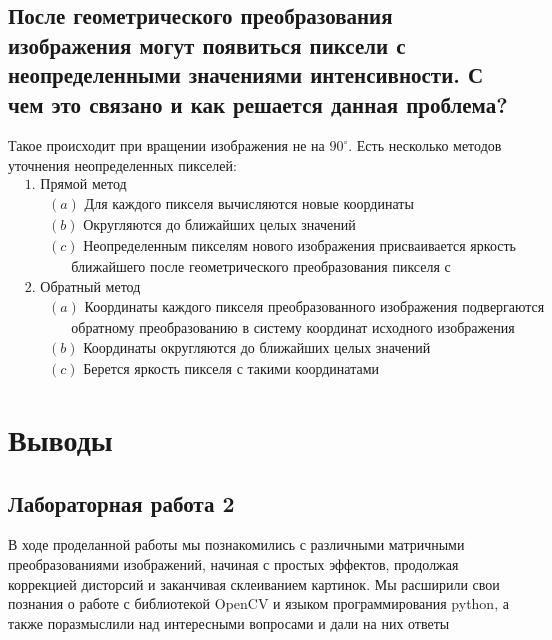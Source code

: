 \documentclass[a4paper, 16pt]{article}
\begin{document}
\subsection{После геометрического преобразования изображения могут появиться пиксели с неопределенными значениями интенсивности. С чем это связано и как решается данная проблема?}
\noindent Такое происходит при вращении изображения не на $90^{\circ}$. Есть несколько методов уточнения неопределенных пикселей:
\begin{align*}
    & 1. \text{ Прямой метод}\\
    & \,\,\,\,\,\,\,\,\,\,(a)\text{ Для каждого пикселя вычисляются новые координаты}\\
    & \,\,\,\,\,\,\,\,\,\,(b)\text{ Округляются до ближайших целых значений}\\
    & \,\,\,\,\,\,\,\,\,\,(c)\text{ Неопределенным пикселям нового изображения присваивается яркость}\\
    & \,\,\,\,\,\,\,\,\,\,\,\,\,\,\,\,\,\,\,\,\text{ближайшего после геометрического преобразования пикселя с неокругленными координатами}\\
    & 2. \text{ Обратный метод}\\
    & \,\,\,\,\,\,\,\,\,\,(a)\text{ Координаты каждого пикселя преобразованного изображения подвергаются}\\
    & \,\,\,\,\,\,\,\,\,\,\,\,\,\,\,\,\,\,\,\,\text{обратному преобразованию в систему координат исходного изображения}\\
    & \,\,\,\,\,\,\,\,\,\,(b)\text{ Координаты округляются до ближайших целых значений}\\
    & \,\,\,\,\,\,\,\,\,\,(c)\text{ Берется яркость пикселя с такими координатами}
\end{align*}


\section{Выводы}
\subsection{Лабораторная работа 2}
\noindent В ходе проделанной работы мы познакомились с различными
матричными преобразованиями изображений, начиная с простых эффектов, продолжая
коррекцией дисторсий и заканчивая склеиванием картинок. Мы расширили свои познания
о работе с библиотекой OpenCV и языком программирования python, а также поразмыслили
над интересными вопросами и дали на них ответы
\end{document}
